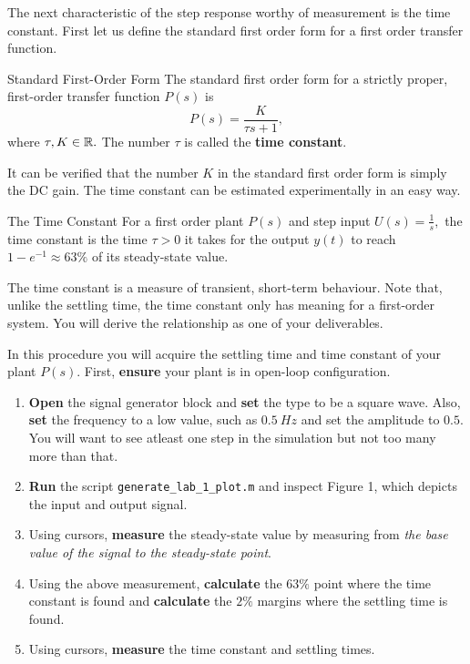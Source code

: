 The next characteristic of the step response worthy of measurement is the
time constant. First let us define the standard first order form for a first
order transfer function.
%
\begin{definition}[]{Standard First-Order Form}
  The standard first order form for a strictly proper, first-order transfer
  function \(P(s)\) is
  \[
    P(s) = \frac{K}{\tau s + 1},
  \]
  where \(\tau, K \in \mathbb{R}.\) The number \(\tau\) is called the \textbf{time
  constant}.
\end{definition}
%
It can be verified that the number \(K\) in the standard first order form
is simply the DC gain. The time constant can be estimated experimentally
in an easy way.
%
\begin{definition}[]{The Time Constant}
  For a first order plant \(P(s)\) and step input \(U(s) = \frac{1}{s},\)
  the time constant is the time \(\tau > 0\) it takes for
  the output \(y(t)\) to reach \(1-e^{-1} \approx 63\%\) of its steady-state value.
\end{definition}
%
The time constant is a measure of transient, short-term behaviour. Note that,
unlike the settling time, the time constant only has meaning for a
first-order system. You will derive the relationship as one of your
deliverables.
%
\begin{procedure}[label={proc:lab1:p4}]
  In this procedure you will acquire the settling time and time constant
  of your plant \(P(s).\) First, \textbf{ensure} your plant is in open-loop
  configuration.
  \begin{enumerate}[label=(\arabic*)]
    \item{
      \textbf{Open} the signal generator block and \textbf{set} the type
      to be a square wave. Also, \textbf{set} the frequency to a low value,
      such as \(\SI{0.5}{Hz}\) and set the amplitude to \(0.5.\)
      You will want to see atleast one step in the simulation but not too
      many more than that.
    }
    \item{
      \textbf{Run} the script \texttt{generate\_lab\_1\_plot.m} and inspect
      Figure 1, which depicts the input and output signal.
    }
    \item{
      Using cursors, \textbf{measure} the steady-state value by measuring from
      \emph{the base value of the signal to the steady-state point}.
    }
    \item{
      Using the above measurement, \textbf{calculate} the \(63\%\) point
      where the time constant is found and \textbf{calculate} the \(2\%\)
      margins where the settling time is found.
    }
    \item{
      Using cursors, \textbf{measure} the time constant and settling times.
    }
  \end{enumerate}
\end{procedure}
